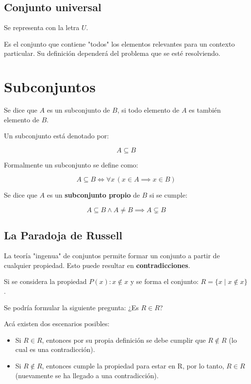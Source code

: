 \documentclass{article}
\begin{document}
\subsection{Conjunto universal} 

Se representa con la letra $U$. 

Es el conjunto que contiene "todos" los elementos relevantes para un contexto particular. Su definición dependerá del problema que se esté resolviendo.

\section{Subconjuntos}

Se dice que $A$ es un subconjunto de $B$, si todo elemento de $A$ es también elemento de $B$. 

Un subconjunto está denotado por: 

\[A \subseteq B\]

Formalmente un subconjunto se define como: 

\[A \subseteq B \iff \forall x \, (x \in A \implies x \in B)\]

Se dice que $A$ es un \textbf{subconjunto propio} de $B$ si se cumple:

\[A \subseteq B \land A \neq B \implies A \subsetneq B\]

\subsection{La Paradoja de Russell}

La teoría "ingenua" de conjuntos permite formar un conjunto a partir de cualquier propiedad. Esto puede resultar en \textbf{contradicciones}. 

Si se considera la propiedad $P(x): x \notin x$ y se forma el conjunto: $R = \{ x \mid x \notin x \}$.

Se podría formular la siguiente pregunta: ¿Es $R \in R$?

Acá existen dos escenarios posibles:

\begin{itemize}
    \item Si $R \in R$, entonces por su propia definición se debe cumplir que $R \notin R$ (lo cual es una contradicción).
    \item Si $R \notin R$, entonces cumple la propiedad para estar en R, por lo tanto, $R \in R$ (nuevamente se ha llegado a una contradicción). 
\end{itemize}
\end{document}
